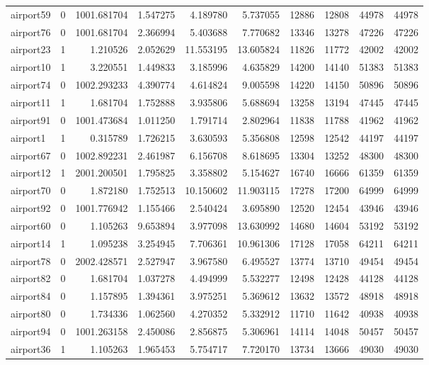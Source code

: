 \begin{longtable}{|l|r|r|r|r|r|r|r|r|r|}
airport59 & 0 & 1001.681704 & 1.547275 & 4.189780 & 5.737055 & 12886 & 12808 & 44978 & 44978 \\
airport76 & 0 & 1001.681704 & 2.366994 & 5.403688 & 7.770682 & 13346 & 13278 & 47226 & 47226 \\
airport23 & 1 & 1.210526 & 2.052629 & 11.553195 & 13.605824 & 11826 & 11772 & 42002 & 42002 \\
airport10 & 1 & 3.220551 & 1.449833 & 3.185996 & 4.635829 & 14200 & 14140 & 51383 & 51383 \\
airport74 & 0 & 1002.293233 & 4.390774 & 4.614824 & 9.005598 & 14220 & 14150 & 50896 & 50896 \\
airport11 & 1 & 1.681704 & 1.752888 & 3.935806 & 5.688694 & 13258 & 13194 & 47445 & 47445 \\
airport91 & 0 & 1001.473684 & 1.011250 & 1.791714 & 2.802964 & 11838 & 11788 & 41962 & 41962 \\
airport1 & 1 & 0.315789 & 1.726215 & 3.630593 & 5.356808 & 12598 & 12542 & 44197 & 44197 \\
airport67 & 0 & 1002.892231 & 2.461987 & 6.156708 & 8.618695 & 13304 & 13252 & 48300 & 48300 \\
airport12 & 1 & 2001.200501 & 1.795825 & 3.358802 & 5.154627 & 16740 & 16666 & 61359 & 61359 \\
airport70 & 0 & 1.872180 & 1.752513 & 10.150602 & 11.903115 & 17278 & 17200 & 64999 & 64999 \\
airport92 & 0 & 1001.776942 & 1.155466 & 2.540424 & 3.695890 & 12520 & 12454 & 43946 & 43946 \\
airport60 & 0 & 1.105263 & 9.653894 & 3.977098 & 13.630992 & 14680 & 14604 & 53192 & 53192 \\
airport14 & 1 & 1.095238 & 3.254945 & 7.706361 & 10.961306 & 17128 & 17058 & 64211 & 64211 \\
airport78 & 0 & 2002.428571 & 2.527947 & 3.967580 & 6.495527 & 13774 & 13710 & 49454 & 49454 \\
airport82 & 0 & 1.681704 & 1.037278 & 4.494999 & 5.532277 & 12498 & 12428 & 44128 & 44128 \\
airport84 & 0 & 1.157895 & 1.394361 & 3.975251 & 5.369612 & 13632 & 13572 & 48918 & 48918 \\
airport80 & 0 & 1.734336 & 1.062560 & 4.270352 & 5.332912 & 11710 & 11642 & 40938 & 40938 \\
airport94 & 0 & 1001.263158 & 2.450086 & 2.856875 & 5.306961 & 14114 & 14048 & 50457 & 50457 \\
airport36 & 1 & 1.105263 & 1.965453 & 5.754717 & 7.720170 & 13734 & 13666 & 49030 & 49030 \\

\end{longtable}
